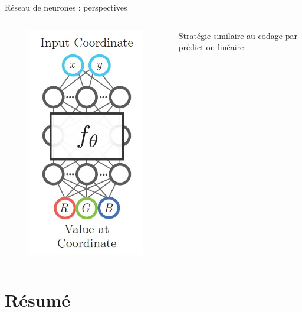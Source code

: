 \documentclass[9pt, aspectratio=169]{beamer}
\begin{document}
\begin{frame}{Réseau de neurones : perspectives} %
\begin{columns}
   \begin{column}{0.48\textwidth}
		\begin{figure}
			\includegraphics[width=.5\textwidth]{fig/tancik2021_xy2rgb.jpg}		
			\caption{\cite{tancik_learned_2021}}
		\end{figure}				

		
   \end{column}
   \begin{column}{0.48\textwidth}
		Stratégie similaire au codage par prédiction linéaire
   \end{column}
\end{columns}
\end{frame}


\section{Résumé}
\end{document}
